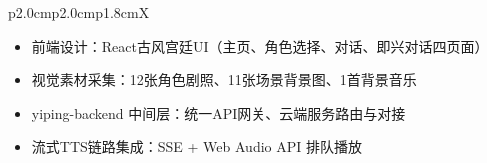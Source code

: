 \documentclass[12pt,a4paper]{article}
\begin{document}
\begin{table}[H]
\begin{tabularx}{\textwidth}{p{2.0cm}p{2.0cm}p{1.8cm}X}
\begin{minipage}[t]{\linewidth}
\begin{itemize}[leftmargin=*, nosep, topsep=0pt]
    \item 前端设计：React古风宫廷UI（主页、角色选择、对话、即兴对话四页面）
    \item 视觉素材采集：12张角色剧照、11张场景背景图、1首背景音乐
    \item yiping-backend 中间层：统一API网关、云端服务路由与对接
    \item 流式TTS链路集成：SSE + Web Audio API 排队播放
\end{itemize}
\end{minipage} \\
\bottomrule
\end{tabularx}
\caption{小组成员分工详情}
\label{tab:team}
\end{table}
\end{document}
